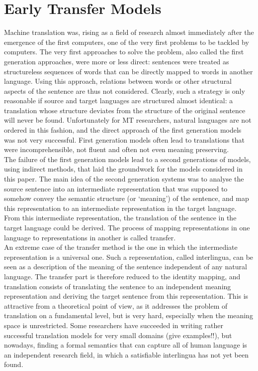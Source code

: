 \documentclass{report}
\theoremstyle{definition}
\theoremstyle{plain}
\begin{document}
\section{Early Transfer Models}
Machine translation was, rising as a field of research almost immediately after the emergence of the first computers, one of the very first problems to be tackled by computers. The very first approaches to solve the problem, also called the first generation approaches, were more or less direct: sentences were treated as structureless sequences of words that can be directly mapped to words in another language. Using this approach, relations between words or other structural aspects of the sentence are thus not considered. Clearly, such a strategy is only reasonable if source and target languages are structured almost identical: a translation whose structure deviates from the structure of the original sentence will never be found. Unfortunately for MT researchers, natural languages are not ordered in this fashion, and the direct approach of the first generation models was not very successful. First generation models often lead to translations that were incomprehensible, not fluent and often not even meaning preserving.\\
The failure of the first generation models lead to a second generations of models, using indirect methods, that laid the groundwork for the models considered in this paper. The main idea of the second generation systems was to analyse the source sentence into an intermediate representation that was supposed to somehow convey the semantic structure (or `meaning') of the sentence, and map this representation to an intermediate representation in the target language. From this intermediate representation, the translation of the sentence in the target language could be derived. The process of mapping representations in one language to representations in another is called transfer.\\
An extreme case of the transfer method is the one in which the intermediate representation is a universal one. Such a representation, called interlingua, can be seen as a description of the meaning of the sentence independent of any natural language. The transfer part is therefore reduced to the identity mapping, and translation consists of translating the sentence to an independent meaning representation and deriving the target sentence from this representation. This is attractive from a theoretical point of view, as it addresses the problem of translation on a fundamental level, but is very hard, especially when the meaning space is unrestricted. Some researchers have succeeded in writing rather successful translation models for very small domains (give examples!!), but nowadays, finding a formal semantics that can capture all of human language is an independent research field, in which a satisfiable interlingua has not yet been found.
\end{document}
